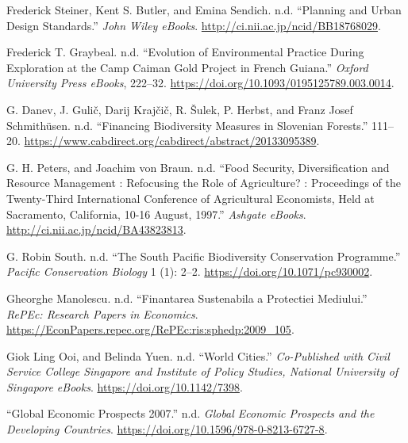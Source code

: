 \begin{CSLReferences}{1}{0}
Frederick Steiner, Kent S. Butler, and Emina Sendich. n.d. {``Planning
and Urban Design Standards.''} \emph{John Wiley eBooks}.
\url{http://ci.nii.ac.jp/ncid/BB18768029}.

Frederick T. Graybeal. n.d. {``Evolution of Environmental Practice
During Exploration at the Camp Caiman Gold Project in French Guiana.''}
\emph{Oxford University Press eBooks}, 222--32.
\url{https://doi.org/10.1093/0195125789.003.0014}.

G. Danev, J. Gulič, Darij Krajčič, R. Šulek, P. Herbst, and Franz Josef
Schmithüsen. n.d. {``Financing Biodiversity Measures in Slovenian
Forests.''} 111--20.
\url{https://www.cabdirect.org/cabdirect/abstract/20133095389}.

G. H. Peters, and Joachim von Braun. n.d. {``Food Security,
Diversification and Resource Management : Refocusing the Role of
Agriculture? : Proceedings of the Twenty-Third International Conference
of Agricultural Economists, Held at Sacramento, California, 10-16
August, 1997.''} \emph{Ashgate eBooks}.
\url{http://ci.nii.ac.jp/ncid/BA43823813}.

G. Robin South. n.d. {``The South Pacific Biodiversity Conservation
Programme.''} \emph{Pacific Conservation Biology} 1 (1): 2--2.
\url{https://doi.org/10.1071/pc930002}.

Gheorghe Manolescu. n.d. {``Finantarea Sustenabila a Protectiei
Mediului.''} \emph{RePEc: Research Papers in Economics}.
\url{https://EconPapers.repec.org/RePEc:ris:sphedp:2009_105}.

Giok Ling Ooi, and Belinda Yuen. n.d. {``World Cities.''}
\emph{Co-Published with Civil Service College Singapore and Institute of
Policy Studies, National University of Singapore eBooks}.
\url{https://doi.org/10.1142/7398}.

{``Global Economic Prospects 2007.''} n.d. \emph{Global Economic
Prospects and the Developing Countries}.
\url{https://doi.org/10.1596/978-0-8213-6727-8}.


\end{CSLReferences}
